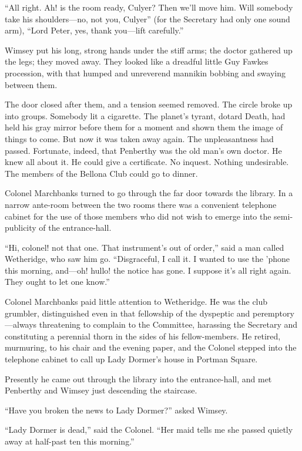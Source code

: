 \enquote{All right. Ah! is the room ready, Culyer? Then we'll move him. Will somebody take his shoulders\allowbreak---\allowbreak no, not you, Culyer} (for the Secretary had only one sound arm), \enquote{Lord Peter, yes, thank you\allowbreak---\allowbreak lift carefully.}

Wimsey put his long, strong hands under the stiff arms; the doctor gathered up the legs; they moved away. They looked like a dreadful little Guy Fawkes procession, with that humped and unreverend mannikin bobbing and swaying between them.

The door closed after them, and a tension seemed removed. The circle broke up into groups. Somebody lit a cigarette. The planet's tyrant, dotard Death, had held his gray mirror before them for a moment and shown them the image of things to come. But now it was taken away again. The unpleasantness had passed. Fortunate, indeed, that Penberthy was the old man's own doctor. He knew all about it. He could give a certificate. No inquest. Nothing undesirable. The members of the Bellona Club could go to dinner.

Colonel Marchbanks turned to go through the far door towards the library. In a narrow ante-room between the two rooms there was a convenient telephone cabinet for the use of those members who did not wish to emerge into the semi-publicity of the entrance-hall.

\enquote{Hi, colonel! not that one. That instrument's out of order,} said a man called Wetheridge, who saw him go. \enquote{Disgraceful, I call it. I wanted to use the 'phone this morning, and\allowbreak---\allowbreak oh! hullo! the notice has gone. I suppose it's all right again. They ought to let one know.}

Colonel Marchbanks paid little attention to Wetheridge. He was the club grumbler, distinguished even in that fellowship of the dyspeptic and peremptory\allowbreak---\allowbreak always threatening to complain to the Committee, harassing the Secretary and constituting a perennial thorn in the sides of his fellow-members. He retired, murmuring, to his chair and the evening paper, and the Colonel stepped into the telephone cabinet to call up Lady Dormer's house in Portman Square.

Presently he came out through the library into the entrance-hall, and met Penberthy and Wimsey just descending the staircase.

\enquote{Have you broken the news to Lady Dormer?} asked Wimsey.

\enquote{Lady Dormer is dead,} said the Colonel. \enquote{Her maid tells me she passed quietly away at half-past ten this morning.}
